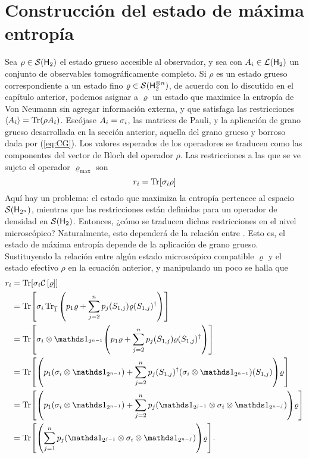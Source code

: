 \section{Construcción del estado de máxima entropía}

Sea $\rho\in\mathcal{S}({\sf H}_{2})$ el estado grueso accesible al observador, y sea  con $A_{i}\in\mathcal{L}({\sf H}_{2})$ un conjunto de observables tomográficamente completo.
Si $\rho$ es un estado grueso correspondiente a un estado fino $\varrho\in\mathcal{S}({\sf H}_{2}^{\otimes n})$, de acuerdo con lo discutido en el capítulo anterior, podemos asignar a $\varrho$ un estado que maximice la entropía de Von Neumann sin agregar  {información externa, y que satisfaga las restricciones $\expval{A_{i}}=\Tr(\rho A_{i})$}.
Escójase ${A_{i}}={\sigma_{i}}$, las matrices de Pauli, y la aplicación de grano grueso desarrollada en la sección anterior, aquella del grano grueso y borroso dada por (\ref{eq:CG}). Los valores esperados de los operadores se traducen como las componentes del vector de Bloch del operador $\rho$. Las restricciones a las que se ve sujeto el operador $\varrho_{\max}$ son
\begin{equation*}
    r_{i}=\Tr[\sigma_{i}\rho]
\end{equation*}
Aquí hay un problema: el estado que maximiza la entropía pertenece al espacio $\mathcal{S}({\sf H}_{2^{n}})$, mientras que las restricciones están definidas para un operador de densidad en $\mathcal{S}({\sf H}_{2})$. Entonces, ¿cómo se traducen dichas restricciones en el nivel microscópico? Naturalmente, esto dependerá de la relación entre . Esto es, el estado de máxima entropía depende de la aplicación de grano grueso. Sustituyendo la relación entre algún estado microscópico compatible $\varrho$ y el estado efectivo $\rho$ en la ecuación anterior, y manipulando un poco se halla que
\begin{align*}
    r_{i}&=\Tr[\sigma_{i}\CG{\varrho}]\\
    &=\Tr[\sigma_{i}\Tr_{\overline{1}}\qty(p_{1}\varrho+\sum_{j=2}^{n}p_{j}(S_{1,j})\varrho(S_{1,j})^{\dagger})]\\
    &=\Tr[\sigma_{i}\otimes\Id_{2^{n-1}}\qty(p_{1}\varrho+\sum_{j=2}^{n}p_{j}(S_{1,j})\varrho(S_{1,j})^{\dagger})]\\
    &=\Tr[\qty(p_{1}(\sigma_{i}\otimes\Id_{2^{n-1}})+\sum_{j=2}^{n}p_{j}(S_{1,j})^{\dagger}(\sigma_{i}\otimes\Id_{2^{n-1}})(S_{1,j}))\varrho]\\
    &=\Tr[\qty(p_{1}(\sigma_{i}\otimes\Id_{2^{n-1}})+\sum_{j=2}^{n}p_{j}(\Id_{2^{j-1}}\otimes\sigma_{i}\otimes\Id_{2^{n-j}}))\varrho]\\
    &=\Tr[\qty(\sum_{j=1}^{n}p_{j}(\Id_{2^{j-1}}\otimes\sigma_{i}\otimes\Id_{2^{n-j}}))\varrho].
\end{align*}
